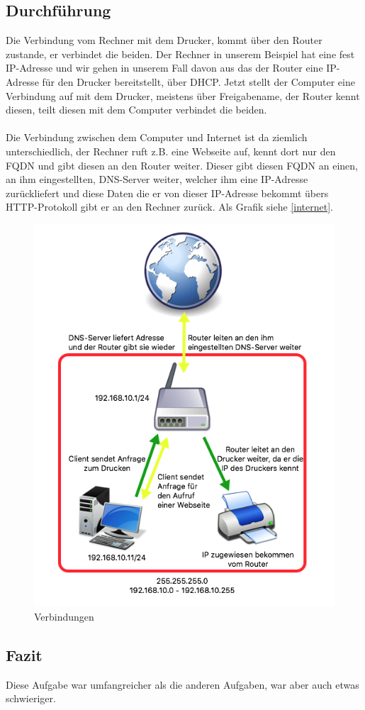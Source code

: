 \subsection{Durchführung}
Die Verbindung vom Rechner mit dem Drucker, kommt über den Router zustande, er verbindet die beiden. Der Rechner in unserem Beispiel hat eine fest IP-Adresse und wir gehen in unserem Fall davon aus das der Router eine IP-Adresse für den Drucker bereitstellt, über DHCP. Jetzt stellt der Computer eine Verbindung auf mit dem Drucker, meistens über Freigabename, der Router kennt diesen, teilt diesen mit dem Computer verbindet die beiden.\\\\Die Verbindung zwischen dem Computer und Internet ist da ziemlich unterschiedlich, der Rechner ruft z.B. eine Webseite auf, kennt dort nur den FQDN und gibt diesen an den Router weiter. Dieser gibt diesen FQDN an einen, an ihm eingestellten, DNS-Server weiter, welcher ihm eine IP-Adresse zurückliefert und diese Daten die er von dieser IP-Adresse bekommt übers HTTP-Protokoll gibt er an den Rechner zurück. Als Grafik siehe \autoref{internet}.

\begin{figure}[H]
	\centering
	\includegraphics[width=0.6 \linewidth]{images/internet}
	\caption{Verbindungen} \label{internet}
\end{figure}  

\subsection{Fazit}
Diese Aufgabe war umfangreicher als die anderen Aufgaben, war aber auch etwas schwieriger.
